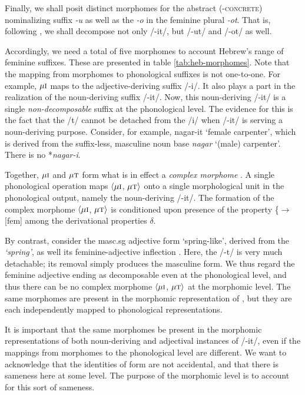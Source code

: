  Finally, we shall posit distinct morphomes for the abstract (-\textsc{concrete}) 
 nominalizing suffix \textit{-u}
 as well as the \textit{-o} in the feminine plural \textit{-ot}.
That is, following \cite{faust:2013}, we shall
decompose not only /-it/, but /-ut/ and /-ot/ as well. 

  Accordingly, we need a total of five morphomes
  to account Hebrew's range of feminine suffixes. These are presented in table \ref{tab:heb-morphomes}. 
  Note that the mapping from 
  morphomes to phonological suffixes is not one-to-one. For example, 
  $\mu{\textsc{i}}$ maps to the adjective-deriving suffix /-i/. It also 
  plays a part in the realization of the noun-deriving suffix /-it/. Now, 
  this noun-deriving /-it/ is a single \emph{non-decomposable} suffix at the phonological 
  level. The evidence for this is the fact that the /t/ cannot be detached 
  from the /i/ when /-it/ is serving a noun-deriving purpose. Consider, for 
  example, nagar-it `female carpenter', which is derived from the suffix-less, 
  masculine noun base \emph{nagar} `(male) carpenter'. 
There is no *\emph{nagar-i}.
  
Together, $\mu\textsc{i}$ and $\mu\textsc{t}$ form what is in effect  
a \emph{complex morphome} \citep{round:2015, round:md:2016}. A single 
phonological operation maps $\langle \mu\textsc{i}$, $\mu\textsc{t} \rangle$ 
onto a single morphological unit in the phonological output, namely the 
noun-deriving /-it/. The formation of the complex morphome $\langle \mu\textsc{i}$, 
$\mu\textsc{t} \rangle$ is conditioned upon presence of the 
property \{$\to$[fem] among the derivational properties $\delta$.

  By contrast, consider the masc.sg adjective form \emph{} 
  `spring-like', derived from the \emph{ `spring'}, 
  as well its feminine-adjective inflection  \emph{}. Here, the /-t/ 
  is very much detachable; its removal simply produces the masculine form. We
  thus regard the feminine adjective ending as decomposable even at the 
  phonological level, and thus there can be no complex morphome $\langle \mu\textsc{i}$, 
  $\mu\textsc{t} \rangle$ at the morphomic level. The same morphomes are present in the 
  morphomic representation of \emph{}, but they are each 
  independently mapped to phonological representations.
  
  It is important that the same morphomes be present in the morphomic 
  representations of both noun-deriving and adjectival instances of /-it/, 
  even if the mappings from morphomes to the phonological level are different. We 
  want to acknowledge that the identities of form are not accidental, 
  and that there is sameness here at some level. The purpose of the 
  morphomic level is to account for
  this sort of sameness.
  
